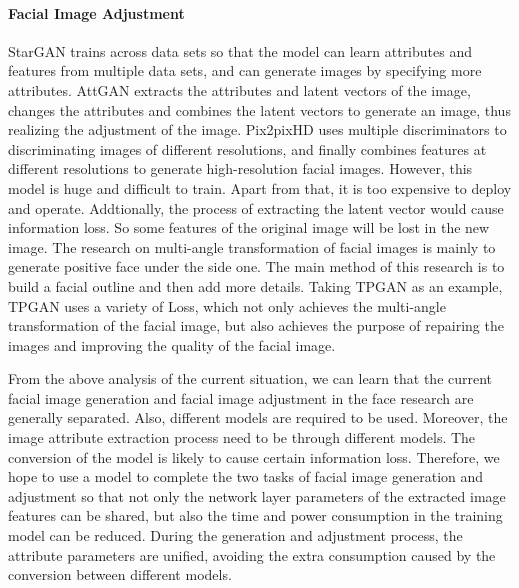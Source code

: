 \paragraph{Facial Image Adjustment}
StarGAN trains across data sets so that the model can learn attributes and features from multiple data sets,
    and can generate images by specifying more attributes.
AttGAN extracts the attributes and latent vectors of the image,
    changes the attributes and combines the latent vectors to generate an image,
    thus realizing the adjustment of the image.
Pix2pixHD uses multiple discriminators to discriminating images of different resolutions,
    and finally combines features at different resolutions to generate high-resolution facial images.
However, this model is huge and difficult to train.
Apart from that, it is too expensive to deploy and operate.
Addtionally, the process of extracting the latent vector would cause information loss.
So some features of the original image will be lost in the new image.
The research on multi-angle transformation of facial images is mainly to generate positive face under the side one.
The main method of this research is to build a facial outline and then add more details.
Taking TPGAN as an example, TPGAN uses a variety of Loss,
    which not only achieves the multi-angle transformation of the facial image,
    but also achieves the purpose of repairing the images and improving the quality of the facial image.

\vspace{3ex}

From the above analysis of the current situation,
    we can learn that the current facial image generation and facial image adjustment in the face research are generally separated.
Also, different models are required to be used.
Moreover, the image attribute extraction process need to be through different models.
The conversion of the model is likely to cause certain information loss.
Therefore, we hope to use a model to complete the two tasks of facial image generation and adjustment so that not only the network layer parameters of the extracted image features can be shared,
    but also the time and power consumption in the training model can be reduced.
During the generation and adjustment process, the attribute parameters are unified,
    avoiding the extra consumption caused by the conversion between different models.